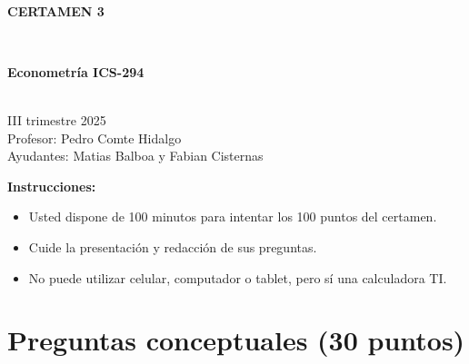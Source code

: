 \documentclass[10pt,a4paper]{article}
\begin{document}
\vspace{5cm}



\begin{center}
\begin{large}
\textbf{\\CERTAMEN 3}
\end{large}\\
\end{center}

\begin{center}
\begin{large}
\textbf{Econometría ICS-294}
\end{large}\\
\vspace{0.2cm}
III trimestre 2025\\
Profesor: Pedro Comte Hidalgo\\
Ayudantes: Matias Balboa y Fabian Cisternas
\end{center}

\textbf{Instrucciones:} 

\begin{itemize}

    \item Usted dispone de 100 minutos  para intentar los 100 puntos del certamen.
    \item Cuide la presentación y redacción de sus preguntas.
    \item No puede utilizar celular, computador o tablet, pero sí una calculadora TI.
     
\end{itemize}

\section{Preguntas conceptuales (30 puntos)}
\end{document}
